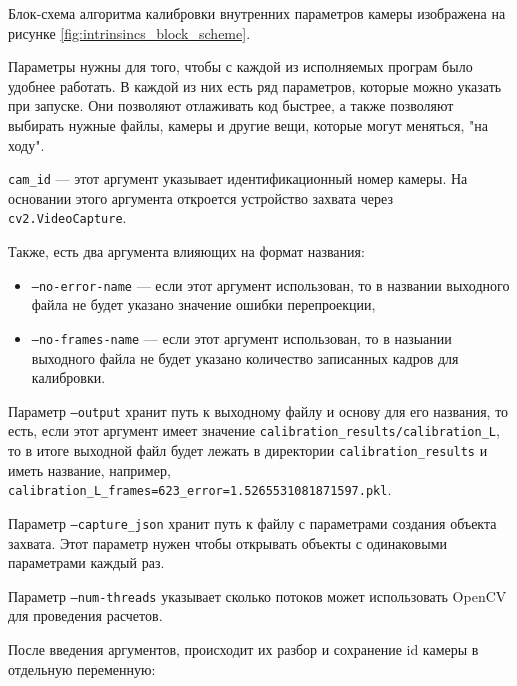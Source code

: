 \documentclass[12pt, a4paper]{article}
\begin{document}
Блок-схема алгоритма калибровки внутренних параметров камеры изображена на
рисунке \ref{fig:intrinsincs_block_scheme}.

Параметры нужны для того, чтобы с каждой из исполняемых програм было удобнее работать.
В каждой из них есть ряд параметров, которые можно указать при запуске. 
Они позволяют отлаживать код быстрее, а также позволяют выбирать нужные файлы,
камеры и другие вещи, которые могут меняться, "на ходу".
\par
\texttt{cam\_id} --- этот аргумент указывает идентификационный номер камеры.
На основании этого аргумента откроется устройство захвата через
\texttt{cv2.VideoCapture}. 

Также, есть два аргумента влияющих на формат названия:
\begin{itemize}
  \item \texttt{--no-error-name} --- если этот аргумент использован, то в
    названии выходного файла не будет указано значение ошибки перепроекции,
  \item \texttt{--no-frames-name} --- если этот аргумент использован, то в
    назыании выходного файла не будет указано количество записанных кадров для
    калибровки.
\end{itemize}

Параметр \texttt{--output} хранит путь к выходному файлу и основу для его
названия, то есть, если этот аргумент имеет значение \texttt{calibration\_results/calibration\_L},
то в итоге выходной файл будет лежать в директории
\texttt{calibration\_results} и иметь название, например, \\
\texttt{calibration\_L\_frames=623\_error=1.5265531081871597.pkl}.

Параметр \texttt{--capture\_json} хранит путь к файлу с параметрами создания
объекта захвата. Этот параметр нужен чтобы открывать объекты с одинаковыми
параметрами каждый раз.

Параметр \texttt{--num-threads} указывает сколько потоков может использовать
OpenCV для проведения расчетов.

После введения аргументов, происходит их разбор и сохранение id камеры в
отдельную переменную:
\end{document}
